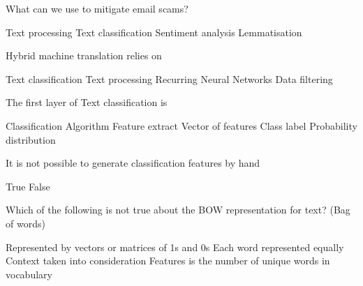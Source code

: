\documentclass[theme=sleek, randomorder, hidesidemenu]{webquiz}
\begin{document}
\begin{question}

  What can we use to mitigate email scams?
  \begin{choice}[columns=2]
    \incorrect Text processing
    \correct Text classification
    \incorrect Sentiment analysis
    \incorrect Lemmatisation
  \end{choice}

\end{question}

\begin{question}

  Hybrid machine translation relies on
  \begin{choice}[columns=2]
    \correct Text classification
    \incorrect Text processing
    \incorrect Recurring Neural Networks
    \incorrect Data filtering
  \end{choice}

\end{question}

\begin{question}

  The first layer of Text classification is
  \begin{choice}[columns=2]
    \incorrect Classification Algorithm
    \correct Feature extract
    \incorrect Vector of features
    \incorrect Class label
    \incorrect Probability distribution
  \end{choice}

\end{question}

\begin{question}

  It is not possible to generate classification features by hand

  \begin{choice}
    \incorrect True
    \correct False
  \end{choice}

\end{question}

\begin{question}
  Which of the following is not true about the BOW representation for text? (Bag of words)

  \begin{choice}
  \incorrect Represented by vectors or matrices of 1s and 0s
  \incorrect Each word represented equally
  \correct Context taken into consideration
  \incorrect Features is the number of unique words in vocabulary
  \end{choice}

\end{question}
\end{document}
